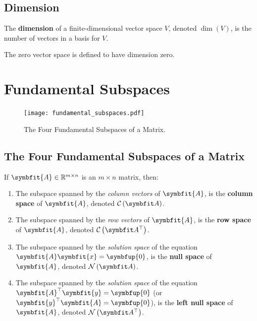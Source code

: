 \documentclass{article}
\begin{document}
\subsection{Dimension}
\begin{definition}
    The \textbf{dimension} of a finite-dimensional vector space \(V\),
    denoted \(\dim{\left( V \right)}\), is the number of vectors in a
    basis for \(V\).
\end{definition}
\begin{theorem}
    The zero vector space is defined to have dimension zero.
\end{theorem}
\newpage
\section{Fundamental Subspaces}
\begin{figure}[H]
    \centering
    \texttt{[image: fundamental\_subspaces.pdf]}
    \caption{The Four Fundamental Subspaces of a Matrix.}
\end{figure}
\subsection{The Four Fundamental Subspaces of a Matrix}
\begin{definition}
    If \(\symbfit{A}\in\mathbb{R}^{m \times n}\) is an \(m \times n\) matrix, then:
    \begin{enumerate}
        \item The subspace spanned by the \textit{column vectors} of
              \(\symbfit{A}\), is the \textbf{column space} of
              \(\symbfit{A}\), denoted \(\columnspace{A}\).
        \item The subspace spanned by the \textit{row vectors} of
              \(\symbfit{A}\), is the \textbf{row space} of \(\symbfit{A}\),
              denoted \(\rowspace{A}\).
        \item The subspace spanned by the \textit{solution space} of the
              equation \(\symbfit{A}\symbfit{x}=\symbfup{0}\), is the
              \textbf{null space} of \(\symbfit{A}\), denoted
              \(\nullspace{A}\).
        \item The subspace spanned by the \textit{solution space} of the
              equation \(\symbfit{A}^{\top}\symbfit{y}=\symbfup{0}\)
              (or \(\symbfit{y}^{\top}\symbfit{A}=\symbfup{0}\)), is the
              \textbf{left null space} of \(\symbfit{A}\), denoted
              \(\leftnullspace{A}\).
    \end{enumerate}
\end{definition}
\end{document}
